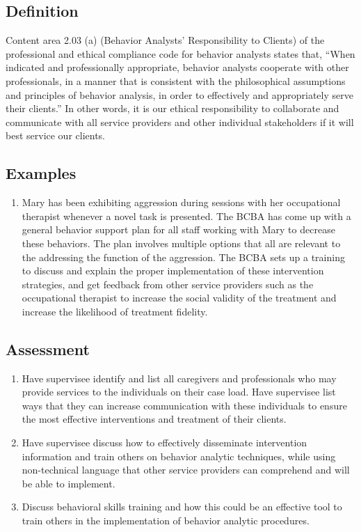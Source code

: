 \subsection{Definition}
Content area 2.03 (a) (Behavior Analysts' Responsibility to Clients) of the professional and ethical compliance code for behavior analysts states that, ``When indicated and professionally appropriate, behavior analysts cooperate with other professionals, in a manner that is consistent with the philosophical assumptions and principles of behavior analysis, in order to effectively and appropriately serve their clients.'' In other words, it is our ethical responsibility to collaborate and communicate with all service providers and other individual stakeholders if it will best service our clients.
%
\subsection{Examples}
\begin{enumerate}
\item Mary has been exhibiting aggression during sessions with her occupational therapist whenever a novel task is presented. The BCBA has come up with a general behavior support plan for all staff working with Mary to decrease these behaviors. The plan involves multiple options that all are relevant to the addressing the function of the aggression. The BCBA sets up a training to discuss and explain the proper implementation of these intervention strategies, and get feedback from other service providers such as the occupational therapist to increase the social validity of the treatment and increase the likelihood of treatment fidelity.
%
\end{enumerate}
%
\subsection{Assessment}
\begin{enumerate}
\item Have supervisee identify and list all caregivers and professionals who may provide services to the individuals on their case load. Have supervisee list ways that they can increase communication with these individuals to ensure the most effective interventions and treatment of their clients.
\item Have supervisee discuss how to effectively disseminate intervention information and train others on behavior analytic techniques, while using non-technical language that other service providers can comprehend and will be able to implement. 
\item Discuss behavioral skills training and how this could be an effective tool to train others in the implementation of behavior analytic procedures. 
%
\end{enumerate}
%
